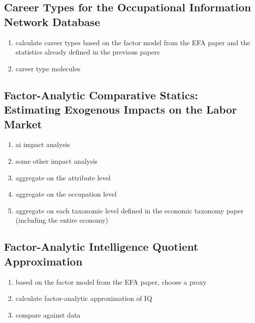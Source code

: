 \documentclass{elsarticle} %
\begin{document}
\subsection{Career Types for the Occupational Information Network Database}
\begin{enumerate}
    \item calculate career types based on the factor model from the EFA paper and the
          statistics already defined in the previous papers
    \item career type molecules
\end{enumerate}

\subsection{Factor-Analytic Comparative Statics: Estimating Exogenous Impacts on the Labor Market}
\begin{enumerate}
    \item ai impact analysis
    \item some other impact analysis
    \item aggregate on the attribute level
    \item aggregate on the occupation level
    \item aggregate on each taxonomic level defined in the economic taxonomy paper
          (including the entire economy)
\end{enumerate}

\subsection{Factor-Analytic Intelligence Quotient Approximation}
\begin{enumerate}
    \item based on the factor model from the EFA paper, choose a proxy
    \item calculate factor-analytic approximation of IQ
    \item compare against data
\end{enumerate}
\end{document}
